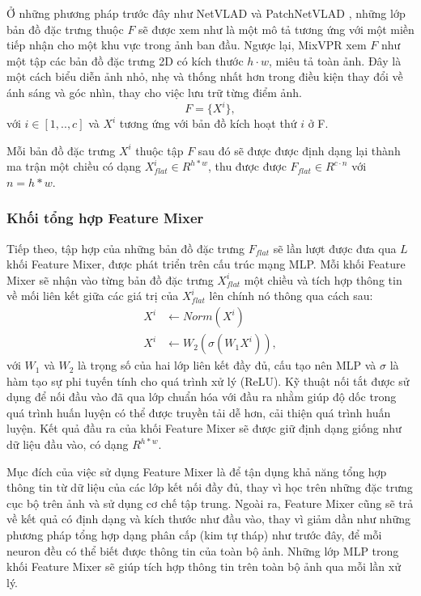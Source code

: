 Ở những phương pháp trước đây như NetVLAD \cite{arandjelovic2016netvlad} và PatchNetVLAD \cite{hausler2021patchnetvlad}, những lớp bản đồ đặc trưng thuộc $F$ sẽ được xem như là một mô tả tương ứng với một miền tiếp nhận cho một khu vực trong ảnh ban đầu. Ngược lại, MixVPR xem $F$ như một tập các bản đồ đặc trưng 2D có kích thước $h \cdot w$, miêu tả toàn ảnh. Đây là một cách biểu diễn ảnh nhỏ, nhẹ và thống nhất hơn trong điều kiện thay đổi về ánh sáng và góc nhìn, thay cho việc lưu trữ từng điểm ảnh.
\begin{equation}
  F = \{X^{i}\},
\end{equation}
với $i \in \left[1,..,c\right]$ và $X^{i}$ tương ứng với bản đồ kích hoạt thứ $i$ ở F.

Mỗi bản đồ đặc trưng $X^{i}$ thuộc tập $F$ sau đó sẽ được được định dạng lại thành ma trận một chiều có dạng $X_{flat}^{i} \in R^{h*w}$, thu được được $F_{flat} \in R^{c \cdot n}$ với $n = h*w$.

\subsubsection{Khối tổng hợp Feature Mixer}
Tiếp theo, tập hợp của những bản đồ đặc trưng $F_{flat}$ sẽ lần lượt được đưa qua $L$ khối Feature Mixer, được phát triển trên cấu trúc mạng MLP. Mỗi khối Feature Mixer sẽ nhận vào từng bản đồ đặc trưng $X_{flat}^{i}$ một chiều và tích hợp thông tin về mối liên kết giữa các giá trị của $X_{flat}^{i}$ lên chính nó thông qua cách sau:
\begin{equation}
  \begin{aligned}
    X^{i} & \leftarrow Norm(X^{i})            \\
    X^{i} & \leftarrow W_2(\sigma(W_1 X^{i})),
  \end{aligned}
\end{equation}
với $W_1$ và $W_2$ là trọng số của hai lớp liên kết đầy đủ, cấu tạo nên MLP và $\sigma$ là hàm tạo sự phi tuyến tính cho quá trình xử lý (ReLU). Kỹ thuật nối tắt được sử dụng để nối đầu vào đã qua lớp chuẩn hóa với đầu ra nhằm giúp độ dốc trong quá trình huấn luyện có thể được truyền tải dễ hơn, cải thiện quá trình huấn luyện. Kết quả đầu ra của khối Feature Mixer sẽ được giữ định dạng giống như dữ liệu đầu vào, có dạng $R^{h*w}$. 

Mục đích của việc sử dụng Feature Mixer là để tận dụng khả năng tổng hợp thông tin từ dữ liệu của các lớp kết nối đầy đủ, thay vì học trên những đặc trưng cục bộ trên ảnh và sử dụng cơ chế tập trung. Ngoài ra, Feature Mixer cũng sẽ trả về kết quả có định dạng và kích thước như đầu vào, thay vì giảm dần như những phương pháp tổng hợp dạng phân cấp (kim tự tháp) như trước đây, để mỗi neuron đều có thể biết được thông tin của toàn bộ ảnh. Những lớp MLP trong khối Feature Mixer sẽ giúp tích hợp thông tin trên toàn bộ ảnh qua mỗi lần xử lý.

